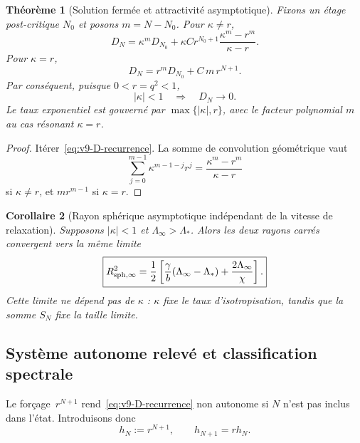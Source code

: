 \documentclass[11pt,a4paper]{article}
\newtheorem{theorem}{Théorème}[section]
\newtheorem{corollary}[theorem]{Corollaire}
\begin{document}
\begin{theorem}[Solution fermée et attractivité asymptotique]\label{thm:v9-closed-defect}
Fixons un étage post-critique $N_0$ et posons $m=N-N_0$. Pour $\kappa\ne r$,
\begin{equation}\label{eq:v9-D-closed}
 \boxed{
 D_N
 =\kappa^mD_{N_0}
 +\kappa C r^{N_0+1}
 \frac{\kappa^m-r^m}{\kappa-r}.}
\end{equation}
Pour $\kappa=r$,
\begin{equation}\label{eq:v9-D-resonant}
 \boxed{
 D_N=r^mD_{N_0}+C\,m\,r^{N+1}.}
\end{equation}
Par conséquent, puisque $0<r=q^2<1$,
\begin{equation}\label{eq:v9-attractive}
 |\kappa|<1
 \quad\Longrightarrow\quad
 \boxed{D_N\longrightarrow0.}
\end{equation}
Le taux exponentiel est gouverné par $\max\{|\kappa|,r\}$, avec le facteur polynomial $m$ au cas résonant $\kappa=r$.
\end{theorem}

\begin{proof}
Itérer~\eqref{eq:v9-D-recurrence}. La somme de convolution géométrique vaut
\[
 \sum_{j=0}^{m-1}\kappa^{m-1-j}r^j
 =\frac{\kappa^m-r^m}{\kappa-r}
\]
si $\kappa\ne r$, et $mr^{m-1}$ si $\kappa=r$.
\end{proof}

\begin{corollary}[Rayon sphérique asymptotique indépendant de la vitesse de relaxation]\label{cor:v9-common-radius}
Supposons $|\kappa|<1$ et $\Lambda_\infty>\Lambda_*$. Alors les deux rayons carrés convergent vers la même limite
\begin{equation}\label{eq:v9-common-radius}
 \boxed{
 R_{\rm sph,\infty}^2
 =\frac12\left[
 \frac{\gamma}{b}(\Lambda_\infty-\Lambda_*)
 +\frac{2\Lambda_\infty}{\chi}
 \right].}
\end{equation}
Cette limite ne dépend pas de $\kappa$ : $\kappa$ fixe le taux d'isotropisation, tandis que la somme $S_N$ fixe la taille limite.
\end{corollary}

\subsection{Système autonome relevé et classification spectrale}

Le forçage~$r^{N+1}$ rend~\eqref{eq:v9-D-recurrence} non autonome si $N$ n'est pas inclus dans l'état. Introduisons donc
\begin{equation}\label{eq:v9-hN}
 h_N:=r^{N+1},
 \qquad
 h_{N+1}=rh_N.
\end{equation}
\end{document}
